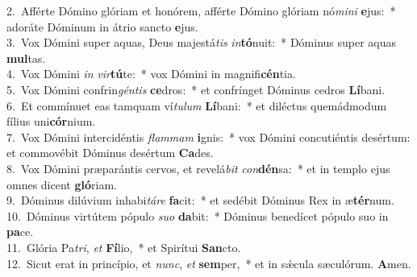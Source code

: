 {2.~}Afférte Dómino glóriam et honórem, afférte Dómino glóriam nó\textit{mi}\textit{ni} \textbf{e}jus:~* adoráte Dóminum in átrio sancto \textbf{e}jus.\\
{3.~}Vox Dómini super aquas, Deus majestá\textit{tis} \textit{in}\textbf{tó}nuit:~* Dóminus super aquas \textbf{mul}tas.\\
{4.~}Vox Dómini \textit{in} \textit{vir}\textbf{tú}te:~* vox Dómini in magnifi\textbf{cén}tia.\\
{5.~}Vox Dómini confrin\textit{gén}\textit{tis} \textbf{ce}dros:~* et confrínget Dóminus cedros \textbf{Lí}bani.\\
{6.~}Et commínuet eas tamquam ví\textit{tu}\textit{lum} \textbf{Lí}bani:~* et diléctus quemádmodum fílius uni\textbf{cór}nium.\\
{7.~}Vox Dómini intercidéntis \textit{flam}\textit{mam} \textbf{i}gnis:~* vox Dómini concutiéntis desértum: et commovébit Dóminus desértum \textbf{Ca}des.\\
{8.~}Vox Dómini præparántis cervos, et revelá\textit{bit} \textit{con}\textbf{dén}sa:~* et in templo ejus omnes dicent \textbf{gló}riam.\\
{9.~}Dóminus dilúvium inhabi\textit{tá}\textit{re} \textbf{fa}cit:~* et sedébit Dóminus Rex in æ\textbf{tér}num.\\
{10.~}Dóminus virtútem pópulo \textit{su}\textit{o} \textbf{da}bit:~* Dóminus benedícet pópulo suo in \textbf{pa}ce.\\
{11.~}Glória Pa\textit{tri}, \textit{et} \textbf{Fí}lio,~* et Spirítui \textbf{San}cto.\\
{12.~}Sicut erat in princípio, et \textit{nunc}, \textit{et} \textbf{sem}per,~* et in sǽcula sæculórum. \textbf{A}men.\\
